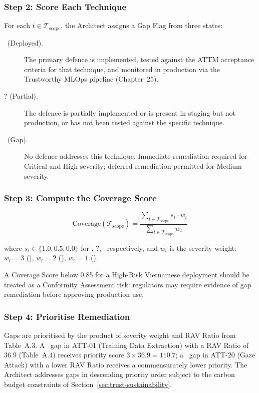 \subsubsection*{Step 2: Score Each Technique}

For each $t \in \mathcal{T}_{\text{scope}}$, the Architect assigns a
Gap Flag from three states:

\begin{description}
  \item[\checkmark\ (Deployed).] The primary defence is implemented,
        tested against the ATTM acceptance criteria for that technique,
        and monitored in production via the Trustworthy MLOps pipeline
        (Chapter~25).
  \item[? (Partial).] The defence is partially implemented or is
        present in staging but not production, or has not been tested
        against the specific technique.
  \item[\ (Gap).] No defence addresses this technique.
        Immediate remediation required for Critical and High severity;
        deferred remediation permitted for Medium severity.
\end{description}

\subsubsection*{Step 3: Compute the Coverage Score}

\begin{equation}
\label{eq:attm-coverage-score}
\text{Coverage}(\mathcal{T}_{\text{scope}}) =
\frac{\sum_{t \in \mathcal{T}_{\text{scope}}}
      s_t \cdot w_t}
     {\sum_{t \in \mathcal{T}_{\text{scope}}} w_t}
\end{equation}

where $s_t \in \{1.0, 0.5, 0.0\}$ for \checkmark, ?, \
respectively, and $w_t$ is the severity weight:
$w_t = 3$ (\critical), $w_t = 2$ (\high), $w_t = 1$ (\medium).

A Coverage Score below 0.85 for a High-Risk Vietnamese deployment
should be treated as a Conformity Assessment risk: regulators may
require evidence of gap remediation before approving production use.

\subsubsection*{Step 4: Prioritise Remediation}

Gaps are prioritised by the product of severity weight and RAV Ratio
from Table~A.3.  A \critical\ gap in ATT-01 (Training Data Extraction)
with a RAV Ratio of 36.9 (Table~A.4) receives priority score
$3 \times 36.9 = 110.7$; a \medium\ gap in ATT-20 (Gaze Attack) with
a lower RAV Ratio receives a commensurately lower priority.  The
Architect addresses gaps in descending priority order subject to the
carbon budget constraints of Section~\ref{sec:trust-sustainability}.

